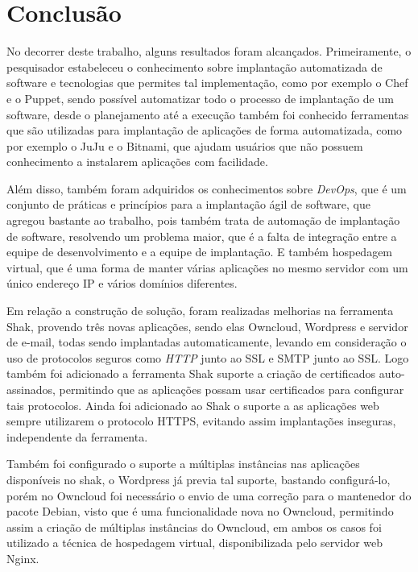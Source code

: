 \chapter{Conclusão}
\label{cap-conclusoes}

No decorrer deste trabalho, alguns resultados foram alcançados. Primeiramente, o
pesquisador estabeleceu o conhecimento sobre implantação automatizada
de software e tecnologias que permites tal implementação, como por exemplo o Chef
e o Puppet, sendo possível automatizar todo o processo de implantação de um software,
desde o planejamento até a execução também foi conhecido ferramentas que são
utilizadas para implantação de aplicações de forma automatizada, como por exemplo
o JuJu e o Bitnami, que ajudam usuários que não possuem conhecimento a
instalarem aplicações com facilidade.

Além disso, também foram adquiridos os conhecimentos sobre \textit{DevOps}, que é um conjunto
de práticas e princípios para a implantação ágil de software, que agregou bastante
ao trabalho, pois também trata de automação de implantação de software, resolvendo
um problema maior, que é a falta de integração entre a equipe de desenvolvimento
e a equipe de implantação. E também hospedagem virtual, que é uma forma de manter
várias aplicações no mesmo servidor com um único endereço IP e vários domínios diferentes.

Em relação a construção de solução, foram realizadas melhorias na ferramenta Shak,
provendo três novas aplicações, sendo elas Owncloud, Wordpress e servidor de e-mail,
todas sendo implantadas automaticamente, levando em consideração o uso de protocolos
seguros como \textit{HTTP} junto ao SSL e SMTP junto ao SSL. Logo também foi adicionado a
ferramenta Shak suporte a criação de certificados auto-assinados, permitindo que
as aplicações possam usar certificados para configurar tais protocolos. Ainda foi
adicionado ao Shak o suporte a as aplicações web sempre utilizarem
o protocolo HTTPS, evitando assim implantações inseguras, independente da ferramenta.

Também foi configurado o suporte a múltiplas instâncias nas aplicações disponíveis
no shak, o Wordpress já previa tal suporte, bastando configurá-lo, porém no Owncloud
foi necessário o envio de uma correção para o mantenedor do pacote Debian, visto que
é uma funcionalidade nova no Owncloud, permitindo assim a criação de múltiplas
instâncias do Owncloud, em ambos os casos foi utilizado a técnica de hospedagem
virtual, disponibilizada pelo servidor web Nginx.

